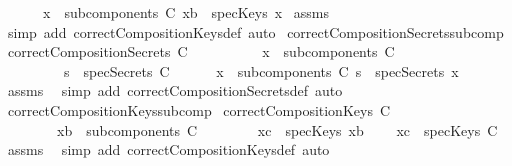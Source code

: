\begin{isabellebody}
\ \ \ \ \ {\isachardoublequoteopen}{\isasymexists}\ x\ {\isasymin}\ subcomponents\ C{\isachardot}\ {\isacharparenleft}xb\ {\isasymin}\ specKeys\ x{\isacharparenright}{\isachardoublequoteclose}\isanewline
%
\isadelimproof
%
\endisadelimproof
%
\isatagproof
{}\isamarkupfalse%
\ assms\ \isamarkupfalse%
\ {\isacharparenleft}simp\ add{\isacharcolon}\ correctCompositionKeys{\isacharunderscore}def{\isacharcomma}\ auto{\isacharparenright}%
\endisatagproof
{\isafoldproof}%
%
\isadelimproof
\isanewline
%
\endisadelimproof
\isanewline
{}\isamarkupfalse%
\ correctCompositionSecrets{\isacharunderscore}subcomp{}{\isacharcolon}\isanewline
{}\ {\isachardoublequoteopen}correctCompositionSecrets\ C{\isachardoublequoteclose}\ \isanewline
\ \ \ \ \ \ \ \ \ {\isachardoublequoteopen}x\ {\isasymin}\ subcomponents\ C{\isachardoublequoteclose}\isanewline
\ \ \ \ \ \ \ \ \ {\isachardoublequoteopen}s\ {\isasymin}\ specSecrets\ C{\isachardoublequoteclose}\isanewline
{}\ \ \ \ \ {\isachardoublequoteopen}{\isasymexists}\ x\ {\isasymin}\ subcomponents\ C{\isachardot}\ {\isacharparenleft}s\ {\isasymin}\ specSecrets\ x{\isacharparenright}{\isachardoublequoteclose}\isanewline
%
\isadelimproof
%
\endisadelimproof
%
\isatagproof
{}\isamarkupfalse%
\ assms\ \isamarkupfalse%
\ {\isacharparenleft}simp\ add{\isacharcolon}\ correctCompositionSecrets{\isacharunderscore}def{\isacharcomma}\ auto{\isacharparenright}%
\endisatagproof
{\isafoldproof}%
%
\isadelimproof
\isanewline
%
\endisadelimproof
\isanewline
{}\isamarkupfalse%
\ correctCompositionKeys{\isacharunderscore}subcomp{}{\isacharcolon}\isanewline
{}\ {\isachardoublequoteopen}correctCompositionKeys\ C{\isachardoublequoteclose}\isanewline
\ \ \ \ \ \ \ \ {\isachardoublequoteopen}xb\ {\isasymin}\ subcomponents\ C{\isachardoublequoteclose}\isanewline
\ \ \ \ \ \ \ \ {\isachardoublequoteopen}xc\ {\isasymin}\ specKeys\ xb{\isachardoublequoteclose}\isanewline
{}\ \ \ \ {\isachardoublequoteopen}xc\ {\isasymin}\ specKeys\ C{\isachardoublequoteclose}\isanewline
%
\isadelimproof
%
\endisadelimproof
%
\isatagproof
{}\isamarkupfalse%
\ assms\ \isamarkupfalse%
\ {\isacharparenleft}simp\ add{\isacharcolon}\ correctCompositionKeys{\isacharunderscore}def{\isacharcomma}\ auto{\isacharparenright}%
\endisatagproof
{\isafoldproof}%
%
\isadelimproof
\isanewline
%
\endisadelimproof

\end{isabellebody}
